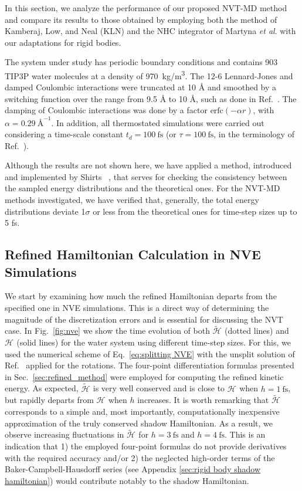 \documentclass[
	aip,
	jcp,
	reprint,
]{revtex4-1}
\newcommand{\Ham}[1]{{\mathcal H}_\text{#1}}           %
\newcommand{\timestep}{h}
\newcommand{\refined}[1]{\widetilde{#1}}
\begin{document}
In this section, we analyze the performance of our proposed NVT-MD method and compare its results to those obtained by employing both the method of Kamberaj, Low, and Neal \cite{Kamberaj_2005} (KLN) and the NHC integrator of Martyna \textit{et al}. \cite{Martyna_1996} with our adaptations for rigid bodies.

The system under study has periodic boundary conditions and contains 903 TIP3P \cite{Jorgensen_1983} water molecules at a density of 970~kg/m\textsuperscript{3}.
The 12-6 Lennard-Jones and damped Coulombic interactions were truncated at 10 {\AA} and smoothed by a switching function over the range from 9.5 {\AA} to 10 {\AA}, such as done in Ref.~. 
The damping of Coulombic interactions was done by a factor $\text{erfc}(-\alpha r)$, with $\alpha = 0.29~\text{\AA}^{-1}$.
In addition, all thermostated simulations were carried out considering a time-scale constant $t_d = 100~\text{fs}$ (or $\tau = 100~\text{fs}$, in the terminology of Ref.~).

Although the results are not shown here, we have applied a method, introduced and implemented by Shirts ~\cite{Shirts_2013}, that serves for checking the consistency between the sampled energy distributions and the theoretical ones. For the NVT-MD methods investigated, we have verified that, generally, the total energy distributions deviate 1$\sigma$ or less from the theoretical ones for time-step sizes up to 5 fs. 

\subsection{Refined Hamiltonian Calculation in NVE Simulations}

We start by examining how much the refined Hamiltonian departs from the specified one in NVE simulations.
This is a direct way of determining the magnitude of the discretization errors \cite{Engle_2005} and is essential for discussing the NVT case.
In Fig.~\ref{fig:nve} we show the time evolution of both $\refined{\Ham{}}$ (dotted lines) and $\Ham{}$ (solid lines) for the water system using different time-step sizes.
For this, we used the numerical scheme of Eq.~\eqref{eq:splitting NVE} with the unsplit solution of Ref.~ applied for the rotations.
The four-point differentiation formulas presented in Sec.~\ref{sec:refined_method} were employed for computing the refined kinetic energy.
As expected, $\refined{\Ham{}}$ is very well conserved and is close to $\Ham{}$ when $\timestep = 1~\text{fs}$, but rapidly departs from $\Ham{}$ when $\timestep$ increases.
It is worth remarking that $\refined{\Ham{}}$ corresponds to a simple and, most importantly, computationally inexpensive approximation of the truly conserved shadow Hamiltonian.
As a result, we observe increasing fluctuations in $\refined{\Ham{}}$ for $\timestep = 3~\text{fs}$ and $\timestep = 4~\text{fs}$.
This is an indication that
1) the employed four-point formulas do not provide derivatives with the required accuracy and/or
2) the neglected high-order terms of the Baker-Campbell-Hausdorff series (see Appendix \ref{sec:rigid body shadow hamiltonian}) would contribute notably to the shadow Hamiltonian.
\end{document}
